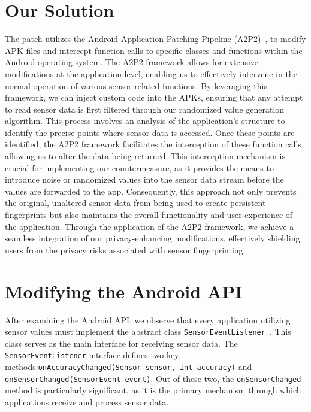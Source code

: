 \documentclass[11pt,
  oneside,openany,    %
]{scrreprt}
\begin{document}
\section{Our Solution}
\label{sec:our_solution}
The patch utilizes the Android Application Patching Pipeline (A2P2)~\cite{draschbacher2023a2p2}, to modify APK files and intercept function calls to specific classes and functions within the Android operating system.
The A2P2 framework allows for extensive modifications at the application level, enabling us to effectively intervene in the normal operation of various sensor-related functions.
By leveraging this framework, we can inject custom code into the APKs, ensuring that any attempt to read sensor data is first filtered through our randomized value generation algorithm.
This process involves an analysis of the application's structure to identify the precise points where sensor data is accessed.
Once these points are identified, the A2P2 framework facilitates the interception of these function calls, allowing us to alter the data being returned.
This interception mechanism is crucial for implementing our countermeasure, as it provides the means to introduce noise or randomized values into the sensor data stream before the values are forwarded to the app.
Consequently, this approach not only prevents the original, unaltered sensor data from being used to create persistent fingerprints but also maintains the overall functionality and user experience of the application.
Through the application of the A2P2 framework, we achieve a seamless integration of our privacy-enhancing modifications, effectively shielding users from the privacy risks associated with sensor fingerprinting.

\section{Modifying the Android API}
\label{sec:function}
After examining the Android API, we observe that every application utilizing sensor values must implement the abstract class \verb|SensorEventListener|~\cite{android_sensoreventlistener}.
This class serves as the main interface for receiving sensor data.
The \verb|SensorEventListener| interface defines two key methods:\verb|onAccuracyChanged(Sensor sensor, int accuracy)| and \verb|onSensorChanged(SensorEvent event)|.
Out of these two, the \verb|onSensorChanged| method is particularly significant, as it is the primary mechanism through which applications receive and process sensor data.
\end{document}
